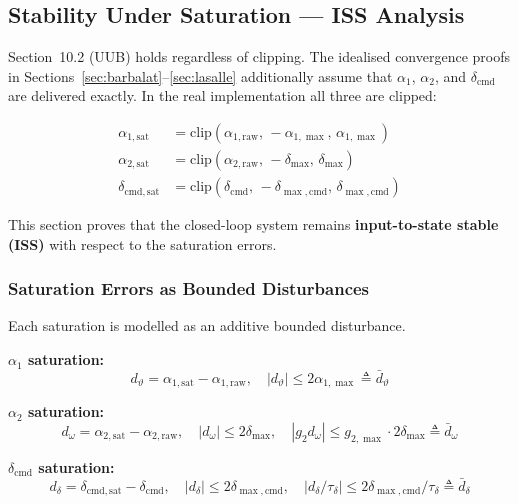 \documentclass[11pt,a4paper]{article}
\theoremstyle{plain}
\theoremstyle{remark}
\newcommand{\clip}{\mathrm{clip}}
\newcommand{\dmax}{\delta_{\max}}
\newcommand{\dcmd}{\delta_{\mathrm{cmd}}}
\begin{document}
\subsection{Stability Under Saturation --- ISS Analysis}
\label{sec:iss}

Section~10.2 (UUB) holds regardless of clipping. The idealised convergence proofs in Sections~\ref{sec:barbalat}--\ref{sec:lasalle} additionally assume that $\alpha_1$, $\alpha_2$, and $\dcmd$ are delivered exactly. In the real implementation all three are clipped:

\begin{align}
  \alpha_{1,\mathrm{sat}} &= \clip(\alpha_{1,\mathrm{raw}},\,-\alpha_{1,\max},\,\alpha_{1,\max}) \\
  \alpha_{2,\mathrm{sat}} &= \clip(\alpha_{2,\mathrm{raw}},\,-\dmax,\,\dmax) \\
  \delta_{\mathrm{cmd},\mathrm{sat}} &= \clip(\dcmd,\,-\delta_{\max,\mathrm{cmd}},\,\delta_{\max,\mathrm{cmd}})
\end{align}

This section proves that the closed-loop system remains \textbf{input-to-state stable (ISS)} with respect to the saturation errors.

\subsubsection{Saturation Errors as Bounded Disturbances}

Each saturation is modelled as an additive bounded disturbance.

\textbf{$\alpha_1$ saturation:}
\begin{equation}
  d_\vartheta = \alpha_{1,\mathrm{sat}} - \alpha_{1,\mathrm{raw}}, \quad |d_\vartheta| \leq 2\alpha_{1,\max} \triangleq \bar{d}_\vartheta
\end{equation}

\textbf{$\alpha_2$ saturation:}
\begin{equation}
  d_\omega = \alpha_{2,\mathrm{sat}} - \alpha_{2,\mathrm{raw}}, \quad |d_\omega| \leq 2\dmax, \quad |g_2 d_\omega| \leq g_{2,\max}\cdot 2\dmax \triangleq \bar{d}_\omega
\end{equation}

\textbf{$\dcmd$ saturation:}
\begin{equation}
  d_\delta = \delta_{\mathrm{cmd},\mathrm{sat}} - \dcmd, \quad |d_\delta| \leq 2\delta_{\max,\mathrm{cmd}}, \quad |d_\delta/\tau_\delta| \leq 2\delta_{\max,\mathrm{cmd}}/\tau_\delta \triangleq \bar{d}_\delta
\end{equation}
\end{document}
